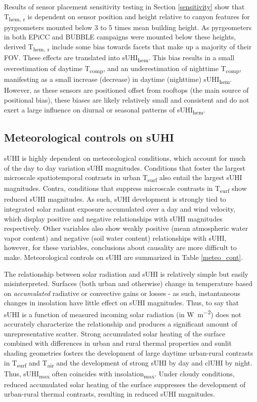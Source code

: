 \begin{bibunit}
Results of sensor placement sensitivity testing in Section \ref{sensitivity} show that T\textsubscript{hem, r} is dependent on sensor position and height relative to canyon features for pyrgeometers mounted below 3 to 5 times mean building height. As pyrgeometers in both EPiCC and BUBBLE campaigns were mounted below these heights, derived T\textsubscript{hem, r} include some bias towards facets that make up a majority of their FOV. These effects are translated into sUHI\textsubscript{hem}. This bias results in a small overestimation of daytime T\textsubscript{comp}, and an underestimation of nighttime T\textsubscript{comp}, manifesting as a small increase (decrease) in daytime (nighttime) sUHI\textsubscript{hem}. However, as these sensors are positioned offset from rooftops (the main source of positional bias), these biases are likely relatively small and consistent and do not exert a large influence on diurnal or seasonal patterns of sUHI\textsubscript{hem}.

\subsection{Meteorological controls on sUHI}

sUHI is highly dependent on meteorological conditions, which account for much of the day to day variation sUHI magnitudes. Conditions that foster the largest microscale spatiotemporal contrasts in urban T\textsubscript{surf} also entail the largest sUHI magnitudes. Contra, conditions that suppress microscale contrasts in T\textsubscript{surf} show reduced sUHI magnitudes. As such, sUHI development is strongly tied to integrated solar radiant exposure accumulated over a day and wind velocity, which display positive and negative relationships with sUHI magnitudes respectively. Other variables also show weakly positive (mean atmospheric water vapor content) and negative (soil water content) relationships with sUHI, however, for these variables, conclusions about causality are more difficult to make. Meteorological controls on sUHI are summarized in Table \ref{meteo_cont}.

The relationship between solar radiation and sUHI is relatively simple but easily misinterpreted. Surfaces (both urban and otherwise) change in temperature based on \textit{accumulated} radiative or convective gains or losses - as such, instantaneous changes in insolation have little effect on sUHI magnitudes. Thus, to say that sUHI is a function of measured incoming solar radiation (in \si{\watt\per\square\meter}) does not accurately characterize the relationship and produces a significant amount of unrepresentative scatter. Strong accumulated solar heating of the surface combined with differences in urban and rural thermal properties and sunlit shading geometries fosters the development of large daytime urban-rural contrasts in T\textsubscript{surf} and T\textsubscript{air} and the development of strong sUHI by day and clUHI by night. Thus, sUHI\textsubscript{max} often coincides with insolation\textsubscript{max}. Under cloudy conditions, reduced accumulated solar heating of the surface suppresses the development of urban-rural thermal contrasts, resulting in reduced sUHI magnitudes. 


\end{bibunit}
